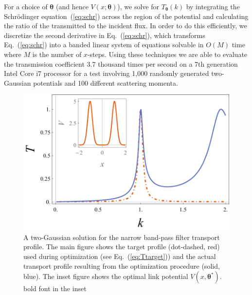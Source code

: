 \documentclass[twocolumn,amsmath,amssymb,showpacs,prl,superscriptaddress,aps]{revtex4-1}
\begin{document}
For a choice of $\bm{\theta}$ (and hence $V(x;\bm{\theta})$), we solve for $T_{\bm{\theta}}(k)$ by integrating the Schr{\"o}dinger equation~(\ref{eq:schr}) across the region of the potential and calculating the ratio of the transmitted to the incident flux. In order to do this efficiently, we discretize the second derivative in Eq.~(\ref{eq:schr}), which transforms Eq.~(\ref{eq:schr}) into
a banded linear system of equations solvable in $O(M)$ time where $M$ is the number of $x$-steps. Using these techniques we are able to evaluate the transmission coefficient 3.7 thousand times per second on a 7th generation Intel Core i7 processor for a test involving 1,000 randomly generated two-Gaussian potentials and 100 different scattering momenta. 

\begin{figure}
   \includegraphics[width=1\linewidth]{figures/plot_transport_profiles_with_inset.pdf}
 \caption[Narrow band-pass filter link potential]{A two-Gaussian solution for the narrow band-pass filter transport profile. The main figure shows the target profile (dot-dashed, red) used during optimization (see Eq.~(\ref{eq:Ttarget})) and the actual transport profile resulting from the optimization procedure (solid, blue). The inset figure shows the optimal link potential $V(x, \bm{\theta^*})$. {\color{red} bold font in the inset}}
 \label{fig:method_illustration}
\end{figure}

\end{document}
